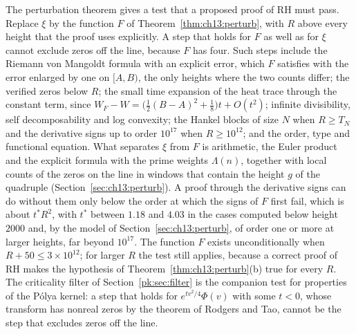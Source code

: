 The perturbation theorem gives a test that a proposed proof of RH must pass. Replace $\xi$ by the function $F$ of Theorem~\ref{thm:ch13:perturb}, with $R$ above every height that the proof uses explicitly. A step that holds for $F$ as well as for $\xi$ cannot exclude zeros off the line, because $F$ has four. Such steps include the Riemann von Mangoldt formula with an explicit error, which $F$ satisfies with the error enlarged by one on $[A,B)$, the only heights where the two counts differ; the verified zeros below $R$; the small time expansion of the heat trace through the constant term, since $W_F-W=\big(\frac12(B-A)^2+\frac18\big)t+O(t^2)$; infinite divisibility, self decomposability and log convexity; the Hankel blocks of size $N$ when $R\ge T_N$ and the derivative signs up to order $10^{17}$ when $R\ge10^{12}$; and the order, type and functional equation. What separates $\xi$ from $F$ is arithmetic, the Euler product and the explicit formula with the prime weights $\Lambda(n)$, together with local counts of the zeros on the line in windows that contain the height $g$ of the quadruple (Section~\ref{sec:ch13:perturb}). A proof through the derivative signs can do without them only below the order at which the signs of $F$ first fail, which is about $t^*R^2$, with $t^*$ between $1.18$ and $4.03$ in the cases computed below height $2000$ and, by the model of Section~\ref{sec:ch13:perturb}, of order one or more at larger heights, far beyond $10^{17}$. The function $F$ exists unconditionally when $R+50\le3\times10^{12}$; for larger $R$ the test still applies, because a correct proof of RH makes the hypothesis of Theorem~\ref{thm:ch13:perturb}(b) true for every $R$. The criticality filter of Section~\ref{pk:sec:filter} is the companion test for properties of the P\'olya kernel: a step that holds for $e^{tv^2/4}\Phi(v)$ with some $t<0$, whose transform has nonreal zeros by the theorem of Rodgers and Tao, cannot be the step that excludes zeros off the line.

